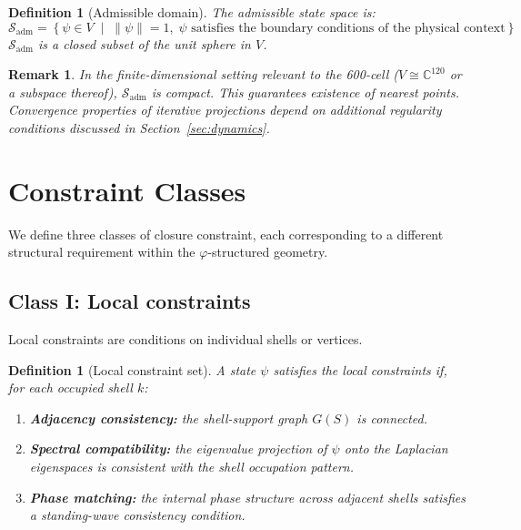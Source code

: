 \documentclass[12pt]{article}
\newtheorem{definition}[theorem]{Definition}
\newtheorem{remark}[theorem]{Remark}
\newcommand{\Sadm}{\mathcal{S}_{\mathrm{adm}}}
\newcommand{\phig}{\varphi}
\begin{document}
\begin{definition}[Admissible domain]\label{def:admissible}
The admissible state space is:
\begin{equation}
    \Sadm = \left\{\psi \in V \;\middle|\; \|\psi\| = 1,\; \psi \text{ satisfies the boundary conditions of the physical context}\right\}
\end{equation}
$\Sadm$ is a closed subset of the unit sphere in $V$.
\end{definition}

\begin{remark}
In the finite-dimensional setting relevant to the 600-cell ($V \cong \mathbb{C}^{120}$ or a subspace thereof), $\Sadm$ is compact. This guarantees existence of nearest points. Convergence properties of iterative projections depend on additional regularity conditions discussed in Section~\ref{sec:dynamics}.
\end{remark}

\section{Constraint Classes}\label{sec:constraints}

We define three classes of closure constraint, each corresponding to a different structural requirement within the $\phig$-structured geometry.

\subsection{Class I: Local constraints}

Local constraints are conditions on individual shells or vertices.

\begin{definition}[Local constraint set]\label{def:local}
A state $\psi$ satisfies the local constraints if, for each occupied shell $k$:
\begin{enumerate}
    \item \textbf{Adjacency consistency:} the shell-support graph $G(S)$ is connected.
    \item \textbf{Spectral compatibility:} the eigenvalue projection of $\psi$ onto the Laplacian eigenspaces is consistent with the shell occupation pattern.
    \item \textbf{Phase matching:} the internal phase structure across adjacent shells satisfies a standing-wave consistency condition.
\end{enumerate}
\end{definition}
\end{document}
